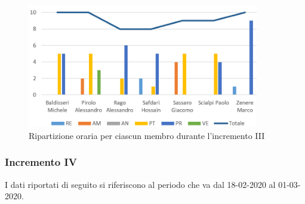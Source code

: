 \begin{figure}[!htb]   
    \centering
    \includegraphics[width=0.9\textwidth]{Images/inc3}
	\caption{Ripartizione oraria per ciascun membro durante l'incremento III}
\end{figure}

\subsubsection{Incremento IV}

I dati riportati di seguito si riferiscono al periodo che va dal 18-02-2020 al 01-03-2020.

